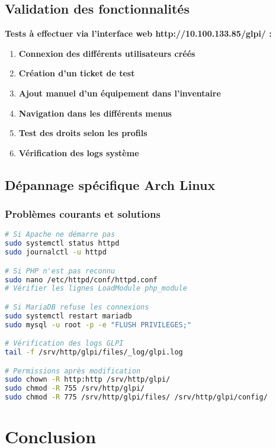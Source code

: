 \documentclass[12pt,a4paper]{article}
\begin{document}
\subsection{Validation des fonctionnalités}
\textbf{Tests à effectuer via l'interface web http://10.100.133.85/glpi/ :}
\begin{enumerate}
    \item \textbf{Connexion des différents utilisateurs créés}
    \item \textbf{Création d'un ticket de test}
    \item \textbf{Ajout manuel d'un équipement dans l'inventaire}
    \item \textbf{Navigation dans les différents menus}
    \item \textbf{Test des droits selon les profils}
    \item \textbf{Vérification des logs système}
\end{enumerate}

\subsection{Dépannage spécifique Arch Linux}

\subsubsection{Problèmes courants et solutions}
\begin{lstlisting}[language=bash, caption=Dépannage Arch Linux]
# Si Apache ne démarre pas
sudo systemctl status httpd
sudo journalctl -u httpd

# Si PHP n'est pas reconnu
sudo nano /etc/httpd/conf/httpd.conf
# Vérifier les lignes LoadModule php_module

# Si MariaDB refuse les connexions
sudo systemctl restart mariadb
sudo mysql -u root -p -e "FLUSH PRIVILEGES;"

# Vérification des logs GLPI
tail -f /srv/http/glpi/files/_log/glpi.log

# Permissions après modification
sudo chown -R http:http /srv/http/glpi/
sudo chmod -R 755 /srv/http/glpi/
sudo chmod -R 775 /srv/http/glpi/files/ /srv/http/glpi/config/
\end{lstlisting}

\section{Conclusion}
\end{document}

